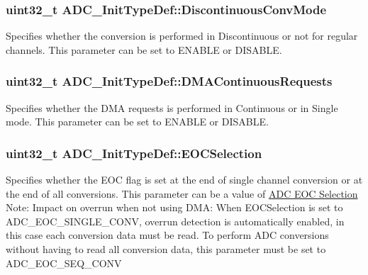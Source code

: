 \subsubsection[{\texorpdfstring{Discontinuous\+Conv\+Mode}{DiscontinuousConvMode}}]{\setlength{\rightskip}{0pt plus 5cm}uint32\+\_\+t A\+D\+C\+\_\+\+Init\+Type\+Def\+::\+Discontinuous\+Conv\+Mode}\hypertarget{struct_a_d_c___init_type_def_a35cc74067e2d269bb2f5e8d71c245b4b}{}\label{struct_a_d_c___init_type_def_a35cc74067e2d269bb2f5e8d71c245b4b}
Specifies whether the conversion is performed in Discontinuous or not for regular channels. This parameter can be set to E\+N\+A\+B\+LE or D\+I\+S\+A\+B\+LE. 
\subsubsection[{\texorpdfstring{D\+M\+A\+Continuous\+Requests}{DMAContinuousRequests}}]{\setlength{\rightskip}{0pt plus 5cm}uint32\+\_\+t A\+D\+C\+\_\+\+Init\+Type\+Def\+::\+D\+M\+A\+Continuous\+Requests}\hypertarget{struct_a_d_c___init_type_def_afa360066652d6e8a2a3f56426b756fab}{}\label{struct_a_d_c___init_type_def_afa360066652d6e8a2a3f56426b756fab}
Specifies whether the D\+MA requests is performed in Continuous or in Single mode. This parameter can be set to E\+N\+A\+B\+LE or D\+I\+S\+A\+B\+LE. 
\subsubsection[{\texorpdfstring{E\+O\+C\+Selection}{EOCSelection}}]{\setlength{\rightskip}{0pt plus 5cm}uint32\+\_\+t A\+D\+C\+\_\+\+Init\+Type\+Def\+::\+E\+O\+C\+Selection}\hypertarget{struct_a_d_c___init_type_def_ae3eedd269c3acc6c6933e8a252c36e71}{}\label{struct_a_d_c___init_type_def_ae3eedd269c3acc6c6933e8a252c36e71}
Specifies whether the E\+OC flag is set at the end of single channel conversion or at the end of all conversions. This parameter can be a value of \hyperlink{group___a_d_c___e_o_c_selection}{A\+DC E\+OC Selection} Note\+: Impact on overrun when not using D\+MA\+: When E\+O\+C\+Selection is set to A\+D\+C\+\_\+\+E\+O\+C\+\_\+\+S\+I\+N\+G\+L\+E\+\_\+\+C\+O\+NV, overrun detection is automatically enabled, in this case each conversion data must be read. To perform A\+DC conversions without having to read all conversion data, this parameter must be set to A\+D\+C\+\_\+\+E\+O\+C\+\_\+\+S\+E\+Q\+\_\+\+C\+O\+NV 
